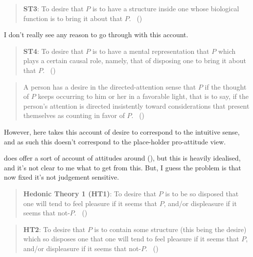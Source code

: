 \documentclass[10pt]{article}
\begin{document}
\begin{quote}
  \textbf{ST3}:
  To desire that \(P\) is to have a structure inside one whose biological function is to bring it about that \(P\).\nolinebreak
  \mbox{ }\hfill(\citeyear[18]{Schroeder:2004aa})
\end{quote}

{\color{red}
  I don't really see any reason to go through with this account.
}

\begin{quote}
  \textbf{ST4}:
  To desire that \(P\) is to have a mental representation that \(P\) which plays a certain causal role, namely, that of disposing one to bring it about that \(P\).\nolinebreak
  \mbox{ }\hfill(\citeyear[24]{Schroeder:2004aa})
\end{quote}

\begin{quote}
  A person has a desire in the directed-attention sense that \(P\) if the thought of \(P\) keeps occurring to him or her in a favorable light, that is to say, if the person’s attention is directed insistently toward considerations that present themselves as counting in favor of \(P\).\nolinebreak
  \mbox{ }(\citeyear[39]{Scanlon:1998aa})
\end{quote}

However, here \citeauthor{Scanlon:1998aa} takes this account of desire to correspond to the intuitive sense, and as such this doesn't correspond to the place-holder pro-attitude view.

\citeauthor{Scanlon:1998aa} does offer a sort of account of attitudes around (\citeyear[20]{Scanlon:1998aa}), but this is heavily idealised, and it's not clear to me what to get from this.
But, I guess the problem is that now fixed it's not judgement sensitive.


\begin{quote}
  \textbf{Hedonic Theory 1 (HT1)}:
  To desire that \(P\) is to be so disposed that one will tend to feel pleasure if it seems that \(P\), and/or displeasure if it seems that not-\(P\).\nolinebreak
  \mbox{ }\hfill(\citeyear[27]{Schroeder:2004aa})
\end{quote}

\begin{quote}
  \textbf{HT2}:
  To desire that \(P\) is to contain some structure (this being the desire) which so disposes one that one will tend to feel pleasure if it seems that \(P\), and/or displeasure if it seems that not-\(P\).\nolinebreak
  \mbox{ }\hfill(\citeyear[27]{Schroeder:2004aa})
\end{quote}
\end{document}
